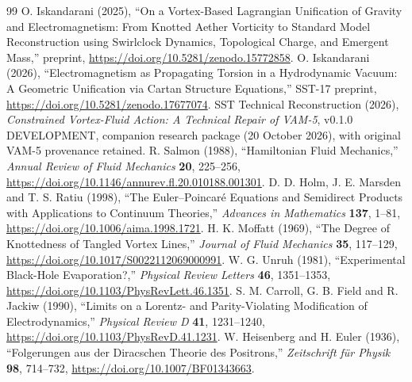 \documentclass[11pt,a4paper]{article}
\begin{document}
\begin{thebibliography}{99}
 O. Iskandarani (2025), ``On a Vortex-Based Lagrangian Unification of Gravity and Electromagnetism: From Knotted Aether Vorticity to Standard Model Reconstruction using Swirlclock Dynamics, Topological Charge, and Emergent Mass,'' preprint, \url{https://doi.org/10.5281/zenodo.15772858}.
 O. Iskandarani (2026), ``Electromagnetism as Propagating Torsion in a Hydrodynamic Vacuum: A Geometric Unification via Cartan Structure Equations,'' SST-17 preprint, \url{https://doi.org/10.5281/zenodo.17677074}.
 SST Technical Reconstruction (2026), \emph{Constrained Vortex-Fluid Action: A Technical Repair of VAM-5}, v0.1.0 DEVELOPMENT, companion research package (20 October 2026), with original VAM-5 provenance retained.
 R. Salmon (1988), ``Hamiltonian Fluid Mechanics,'' \emph{Annual Review of Fluid Mechanics} \textbf{20}, 225--256, \url{https://doi.org/10.1146/annurev.fl.20.010188.001301}.
 D. D. Holm, J. E. Marsden and T. S. Ratiu (1998), ``The Euler--Poincar\'e Equations and Semidirect Products with Applications to Continuum Theories,'' \emph{Advances in Mathematics} \textbf{137}, 1--81, \url{https://doi.org/10.1006/aima.1998.1721}.
 H. K. Moffatt (1969), ``The Degree of Knottedness of Tangled Vortex Lines,'' \emph{Journal of Fluid Mechanics} \textbf{35}, 117--129, \url{https://doi.org/10.1017/S0022112069000991}.
 W. G. Unruh (1981), ``Experimental Black-Hole Evaporation?,'' \emph{Physical Review Letters} \textbf{46}, 1351--1353, \url{https://doi.org/10.1103/PhysRevLett.46.1351}.
 S. M. Carroll, G. B. Field and R. Jackiw (1990), ``Limits on a Lorentz- and Parity-Violating Modification of Electrodynamics,'' \emph{Physical Review D} \textbf{41}, 1231--1240, \url{https://doi.org/10.1103/PhysRevD.41.1231}.
 W. Heisenberg and H. Euler (1936), ``Folgerungen aus der Diracschen Theorie des Positrons,'' \emph{Zeitschrift f\"ur Physik} \textbf{98}, 714--732, \url{https://doi.org/10.1007/BF01343663}.
\end{thebibliography}
\end{document}
